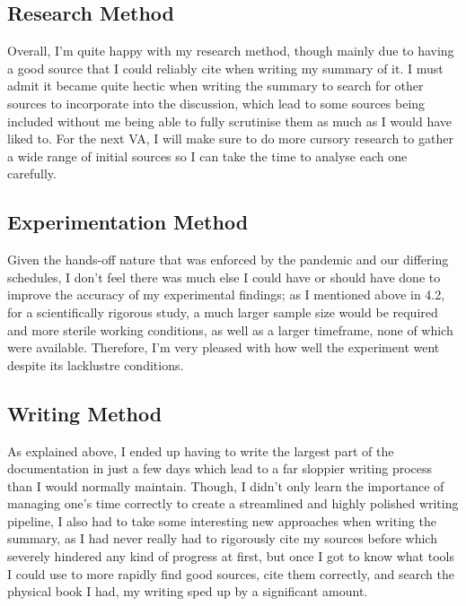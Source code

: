 \documentclass[a4paper,10pt]{article}
\begin{document}
\subsection{Research Method}
Overall, I'm quite happy with my research method, though mainly due to having a good source that I could
reliably cite when writing my summary of it.
I must admit it became quite hectic when writing the summary to search for other sources to incorporate
into the discussion, which lead to some sources being included without me being able to fully scrutinise
them as much as I would have liked to. For the next VA, I will make sure to do more cursory research to
gather a wide range of initial sources so I can take the time to analyse each one carefully.

\subsection{Experimentation Method}
Given the hands-off nature that was enforced by the pandemic and our differing schedules, I don't feel
there was much else I could have or should have done to improve the accuracy of my experimental findings;
as I mentioned above in 4.2, for a scientifically rigorous study, a much larger sample size would be
required and more sterile working conditions, as well as a larger timeframe, none of which were available.
Therefore, I'm very pleased with how well the experiment went despite its lacklustre conditions.

\subsection{Writing Method}
As explained above, I ended up having to write the largest part of the documentation in just a few days
which lead to a far sloppier writing process than I would normally maintain. Though, I didn't only learn
the importance of managing one's time correctly to create a streamlined and highly polished writing
pipeline, I also had to take some interesting new approaches when writing the summary, as I had never
really had to rigorously cite my sources before which severely hindered any kind of progress at first,
but once I got to know what tools I could use to more rapidly find good sources, cite them correctly,
and search the physical book I had, my writing sped up by a significant amount.
\end{document}
